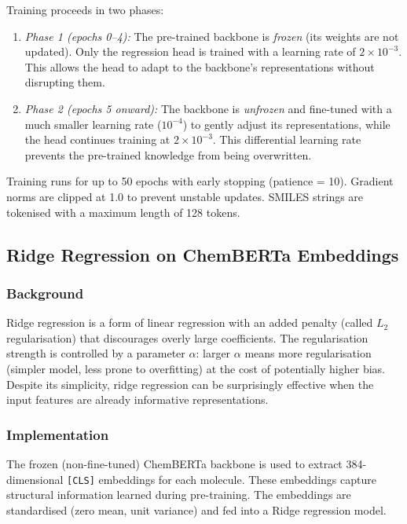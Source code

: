 \documentclass[11pt,a4paper]{article}
\begin{document}
Training proceeds in two phases:
\begin{enumerate}
    \item \textit{Phase 1 (epochs 0--4):} The pre-trained backbone is \emph{frozen} (its weights are not updated). Only the regression head is trained with a learning rate of $2 \times 10^{-3}$. This allows the head to adapt to the backbone's representations without disrupting them.
    \item \textit{Phase 2 (epochs 5 onward):} The backbone is \emph{unfrozen} and fine-tuned with a much smaller learning rate ($10^{-4}$) to gently adjust its representations, while the head continues training at $2 \times 10^{-3}$. This differential learning rate prevents the pre-trained knowledge from being overwritten.
\end{enumerate}

Training runs for up to 50 epochs with early stopping (patience = 10). Gradient norms are clipped at 1.0 to prevent unstable updates. SMILES strings are tokenised with a maximum length of 128 tokens.

\subsection{Ridge Regression on ChemBERTa Embeddings}

\subsubsection*{Background}

Ridge regression is a form of linear regression with an added penalty (called $L_2$ regularisation) that discourages overly large coefficients. The regularisation strength is controlled by a parameter $\alpha$: larger $\alpha$ means more regularisation (simpler model, less prone to overfitting) at the cost of potentially higher bias. Despite its simplicity, ridge regression can be surprisingly effective when the input features are already informative representations.

\subsubsection*{Implementation}

The frozen (non-fine-tuned) ChemBERTa backbone is used to extract 384-dimensional \texttt{[CLS]} embeddings for each molecule. These embeddings capture structural information learned during pre-training. The embeddings are standardised (zero mean, unit variance) and fed into a Ridge regression model.
\end{document}
